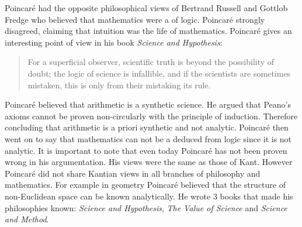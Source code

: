 \documentclass[12pt]{article}
\begin{document}
Poincar\'e had the opposite philosophical views of Bertrand Russell and Gottlob Fredge who believed that mathematics were a  of logic.  Poincar\'e strongly disagreed, claiming that intuition was the life of mathematics.  Poincar\'e gives an interesting point of view in his book \emph{Science and Hypothesis}:
\begin{quote}
For a superficial observer, scientific truth is beyond the possibility of doubt; the logic of science is infallible, and if the scientists are sometimes mistaken, this is only from their mistaking its rule. \cite{PHSH}
\end{quote}
Poincar\'e believed that arithmetic is a synthetic science.  He argued that Peano's axioms cannot be proven non-circularly with the principle of induction.\cite{MM}  Therefore concluding that arithmetic is a priori synthetic and not analytic.  Poincar\'e then went on to say that mathematics can not be a deduced from logic since it is not analytic.  It is important to note that even today Poincar\'e has not been proven wrong in his argumentation. His views were the same as those of Kant\cite{KD}. However Poincar\'e did not share Kantian views in all branches of philosophy and mathematics.  For example in geometry Poincar\'e believed that the structure of non-Euclidean space can be known analytically. He wrote 3 books that made his philosophies known: \emph{Science and Hypothesis}, \emph{The Value of Science} and \emph{Science and Method}.
\end{document}
